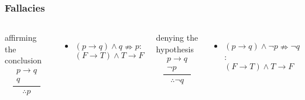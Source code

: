 \documentclass[dvipsnames]{beamer}
\begin{document}
\begin{frame}
  \frametitle{Fallacies}

  \begin{columns}[t]
    \begin{block}{affirming the conclusion}
      \[
      \frac
        {
        \begin{array}{c}
          p \rightarrow q\\
          q
          \end{array}
        }
        {
          \therefore p
        }
      \]
    \end{block}

    \begin{itemize}
      \item $(p \rightarrow q) \wedge q \nRightarrow p$:\\
        $(F \rightarrow T) \wedge T \rightarrow F$
    \end{itemize}

    \pause
    \begin{block}{denying the hypothesis}
      \[
      \frac
        {
          \begin{array}{c}
            p \rightarrow q\\
            \neg p
          \end{array}
        }
        {
          \therefore \neg q
        }
      \]
    \end{block}

    \begin{itemize}
      \item $(p \rightarrow q) \wedge \neg p \nRightarrow \neg q$:\\
        $(F \rightarrow T) \wedge T \rightarrow F$
    \end{itemize}
  \end{columns}
\end{frame}
\end{document}
